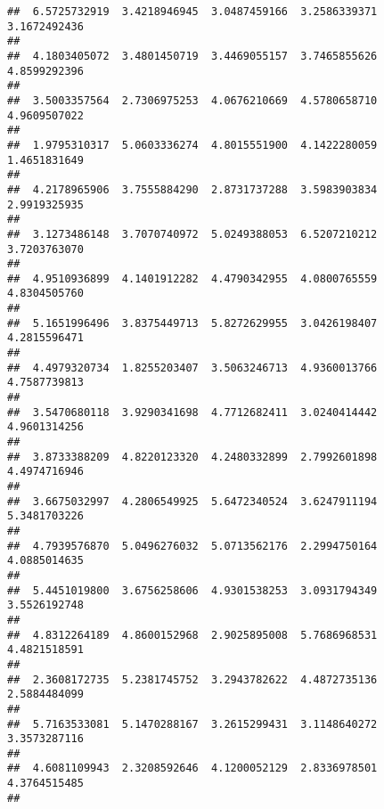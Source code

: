 \documentclass[]{article}
\begin{document}
\begin{verbatim}
##  6.5725732919  3.4218946945  3.0487459166  3.2586339371  3.1672492436 
##                                                                       
##  4.1803405072  3.4801450719  3.4469055157  3.7465855626  4.8599292396 
##                                                                       
##  3.5003357564  2.7306975253  4.0676210669  4.5780658710  4.9609507022 
##                                                                       
##  1.9795310317  5.0603336274  4.8015551900  4.1422280059  1.4651831649 
##                                                                       
##  4.2178965906  3.7555884290  2.8731737288  3.5983903834  2.9919325935 
##                                                                       
##  3.1273486148  3.7070740972  5.0249388053  6.5207210212  3.7203763070 
##                                                                       
##  4.9510936899  4.1401912282  4.4790342955  4.0800765559  4.8304505760 
##                                                                       
##  5.1651996496  3.8375449713  5.8272629955  3.0426198407  4.2815596471 
##                                                                       
##  4.4979320734  1.8255203407  3.5063246713  4.9360013766  4.7587739813 
##                                                                       
##  3.5470680118  3.9290341698  4.7712682411  3.0240414442  4.9601314256 
##                                                                       
##  3.8733388209  4.8220123320  4.2480332899  2.7992601898  4.4974716946 
##                                                                       
##  3.6675032997  4.2806549925  5.6472340524  3.6247911194  5.3481703226 
##                                                                       
##  4.7939576870  5.0496276032  5.0713562176  2.2994750164  4.0885014635 
##                                                                       
##  5.4451019800  3.6756258606  4.9301538253  3.0931794349  3.5526192748 
##                                                                       
##  4.8312264189  4.8600152968  2.9025895008  5.7686968531  4.4821518591 
##                                                                       
##  2.3608172735  5.2381745752  3.2943782622  4.4872735136  2.5884484099 
##                                                                       
##  5.7163533081  5.1470288167  3.2615299431  3.1148640272  3.3573287116 
##                                                                       
##  4.6081109943  2.3208592646  4.1200052129  2.8336978501  4.3764515485 
##                                                                       

\end{verbatim}
\end{document}

